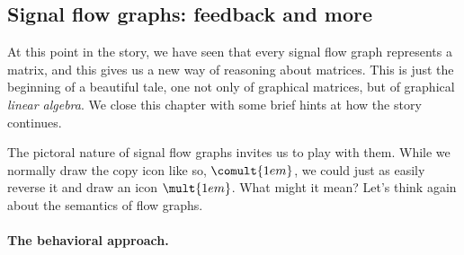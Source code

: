 \documentclass[7Sketches]{subfiles}
\begin{document}
%
%
%
%
%
%
%
%
%

%

\subsection{Signal flow graphs: feedback and more}%
\label{subsec.full_SFGs}%

At this point in the story, we have seen that every signal flow graph represents
a matrix, and this gives us a new way of reasoning about matrices. This is just
the beginning of a beautiful tale, one not only of graphical matrices, but of
graphical \emph{linear algebra}. We close this chapter with some brief hints at
how the story continues.

The pictoral nature of signal flow graphs invites us to play with them.
While we normally draw the copy icon like so, $\comult{1em}$, we
could just as easily reverse it and draw an icon $\mult{1em}$. What might it mean? Let's think
again about the semantics of flow graphs.

\paragraph{The behavioral approach.}%
\end{document}
